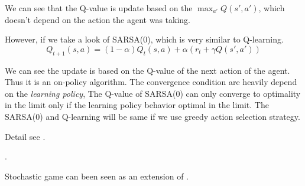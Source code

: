 \documentclass[9pt]{article}
\begin{document}
We can see that the Q-value is update based on the $\max_{a'}Q(s',a')$, which doesn't depend on the action the agent was taking.

However, if we take a look of SARSA(0), which is very similar to Q-learning.
\begin{displaymath}
  Q_{t+1}(s,a) = (1-\alpha)Q_{t}(s,a)+\alpha(r_t+\gamma Q(s',a'))
\end{displaymath}

We can see the update is based on the Q-value of the next action of the agent. Thus it is an on-policy algorithm. The convergence condition are heavily depend on the \textit{learning policy}, The Q-value of SARSA(0) can only converge to optimality in the limit only if the learning policy behavior optimal in the limit. The SARSA(0) and Q-learning will be same if we use greedy action selection strategy.

Detail see \cite{singh2000convergence}.




\Working {}.




\Working

Stochastic game can been seen as an extension of .





\end{document}
